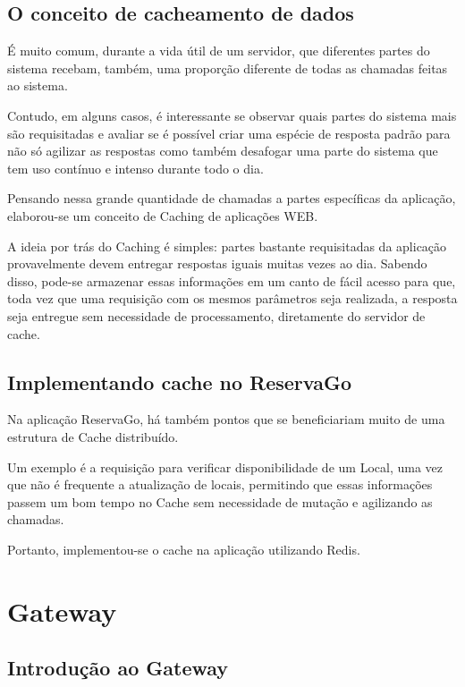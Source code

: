 \documentclass[12pt, openright, oneside, a4paper, article,
  section=TITLE
]{abntex2}
\begin{document}
\subsection{O conceito de cacheamento de dados}

É muito comum, durante a vida útil de um servidor, que diferentes partes do sistema recebam, também, uma proporção diferente de todas as chamadas feitas ao sistema. 

Contudo, em alguns casos, é interessante se observar quais partes do sistema mais são requisitadas e avaliar se é possível criar uma espécie de resposta padrão para não só agilizar as respostas como também desafogar uma parte do sistema que tem uso contínuo e intenso durante todo o dia. 

Pensando nessa grande quantidade de chamadas a partes específicas da aplicação, elaborou-se um conceito de Caching de aplicações WEB. 

A ideia por trás do Caching é simples: partes bastante requisitadas da aplicação provavelmente devem entregar respostas iguais muitas vezes ao dia. Sabendo disso, pode-se armazenar essas informações em um canto de fácil acesso para que, toda vez que uma requisição com os mesmos parâmetros seja realizada, a resposta seja entregue sem necessidade de processamento, diretamente do servidor de cache. 

\subsection{Implementando cache no ReservaGo}

Na aplicação ReservaGo, há também pontos que se beneficiariam muito de uma estrutura de Cache distribuído. 

Um exemplo é a requisição para verificar disponibilidade de um Local, uma vez que não é frequente a atualização de locais, permitindo que essas informações passem um bom tempo no Cache sem necessidade de mutação e agilizando as chamadas. 

Portanto, implementou-se o cache na aplicação utilizando Redis. 

\section{Gateway}

\subsection{Introdução ao Gateway}
\end{document}
